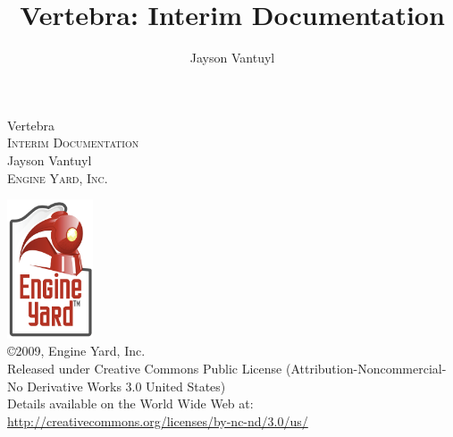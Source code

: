 \title{Vertebra: Interim Documentation}
\author{Jayson Vantuyl}

\begin{titlepage}
\begin{center}

{\LARGE Vertebra}\\[0.5cm]
\textsc{Interim Documentation}\\[2.5cm]

Jayson Vantuyl\\[0.5cm]

\textsc{Engine Yard, Inc.}

\vfill

\includegraphics[width=1in]{figs/png/eylogo}\\[\baselineskip]
\copyright 2009, Engine Yard, Inc.\\[\baselineskip]
Released under Creative Commons Public License (Attribution-Noncommercial-No Derivative Works 3.0 United States)\\[\baselineskip]
Details available on the World Wide Web at:\\
\url{http://creativecommons.org/licenses/by-nc-nd/3.0/us/}
\end{center}
\end{titlepage}
